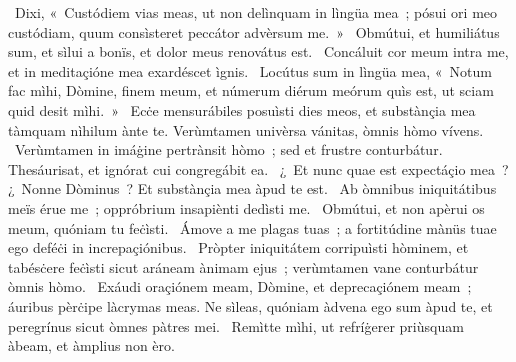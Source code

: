 \psalmChapterWithInscription{}
{ }
{%
~Dixi, «~Custódiem vias meas, ut non delìnquam in lìngüa mea~; pósui ori meo custódiam, quum consìsteret peccátor advèrsum me.~»
~Obmútui, et humiliátus sum, et sìlui a bonïs, et dolor meus renovátus est. 
~Concáluit cor meum intra me, et in meditaçióne mea exardéscet ìgnis. 
~Locútus sum in lìngüa mea, «~Notum fac mìhi, Dòmine, finem meum, et númerum diérum meórum quìs est, ut sciam quid desit mìhi.~»
~Ecċe mensurábiles posuìsti dies meos, et substànçia mea tàmquam nìhilum ànte te. Verùmtamen univèrsa vánitas, òmnis hòmo vívens. 
~Verùmtamen in imáġine pertrànsit hòmo~; sed et frustre conturbátur. Thesáurisat, et ignórat cui congregábit ea. 
~¿~Et nunc quae est expectáçio mea~? ¿~Nonne Dòminus~? Et substànçia mea àpud te est. 
~Ab òmnibus iniquitátibus meïs érue me~; oppróbrium insapiènti dedìsti me. 
~Obmútui, et non apèrui os meum, quóniam tu feċìsti. 
~Ámove a me plagas tuas~; a fortitúdine mànüs tuae ego deféċi in increpaçiónibus. 
~Pròpter iniquitátem corripuìsti hòminem, et tabésċere feċìsti sicut aráneam ànimam ejus~; verùmtamen vane conturbátur òmnis hòmo. 
~Exáudi oraçiónem meam, Dòmine, et deprecaçiónem meam~; áuribus pèrċipe làcrymas meas. Ne sìleas, quóniam àdvena ego sum àpud te, et peregrínus sicut òmnes pàtres mei. 
~Remìtte mìhi, ut refríġerer priùsquam àbeam, et àmplius non èro. 
}
